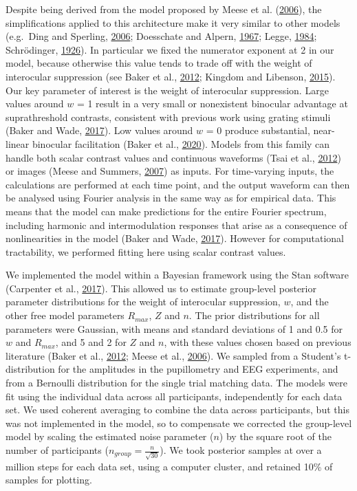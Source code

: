 \documentclass[
]{article}
\begin{document}
Despite being derived from the model proposed by Meese et al. (\protect\hyperlink{ref-Meese2006}{2006}), the simplifications applied to this architecture make it very similar to other models (e.g.~Ding and Sperling, \protect\hyperlink{ref-Ding2006}{2006}; Doesschate and Alpern, \protect\hyperlink{ref-Doesschate1967}{1967}; Legge, \protect\hyperlink{ref-Legge1984}{1984}; Schrödinger, \protect\hyperlink{ref-Schrodinger1926}{1926}). In particular we fixed the numerator exponent at 2 in our model, because otherwise this value tends to trade off with the weight of interocular suppression (see Baker et al., \protect\hyperlink{ref-Baker2012}{2012}; Kingdom and Libenson, \protect\hyperlink{ref-Kingdom2015}{2015}). Our key parameter of interest is the weight of interocular suppression. Large values around \(w\) = 1 result in a very small or nonexistent binocular advantage at suprathreshold contrasts, consistent with previous work using grating stimuli (Baker and Wade, \protect\hyperlink{ref-Baker2017}{2017}). Low values around \(w\) = 0 produce substantial, near-linear binocular facilitation (Baker et al., \protect\hyperlink{ref-Baker2020}{2020}). Models from this family can handle both scalar contrast values and continuous waveforms (Tsai et al., \protect\hyperlink{ref-Tsai2012}{2012}) or images (Meese and Summers, \protect\hyperlink{ref-Meese2007}{2007}) as inputs. For time-varying inputs, the calculations are performed at each time point, and the output waveform can then be analysed using Fourier analysis in the same way as for empirical data. This means that the model can make predictions for the entire Fourier spectrum, including harmonic and intermodulation responses that arise as a consequence of nonlinearities in the model (Baker and Wade, \protect\hyperlink{ref-Baker2017}{2017}). However for computational tractability, we performed fitting here using scalar contrast values.

We implemented the model within a Bayesian framework using the Stan software (Carpenter et al., \protect\hyperlink{ref-Carpenter2017}{2017}). This allowed us to estimate group-level posterior parameter distributions for the weight of interocular suppression, \(w\), and the other free model parameters \(R_{max}\), \(Z\) and \(n\). The prior distributions for all parameters were Gaussian, with means and standard deviations of 1 and 0.5 for \(w\) and \(R_{max}\), and 5 and 2 for \(Z\) and \(n\), with these values chosen based on previous literature (Baker et al., \protect\hyperlink{ref-Baker2012}{2012}; Meese et al., \protect\hyperlink{ref-Meese2006}{2006}). We sampled from a Student's t-distribution for the amplitudes in the pupillometry and EEG experiments, and from a Bernoulli distribution for the single trial matching data. The models were fit using the individual data across all participants, independently for each data set. We used coherent averaging to combine the data across participants, but this was not implemented in the model, so to compensate we corrected the group-level model by scaling the estimated noise parameter (\(n\)) by the square root of the number of participants (\(n_{group} = \frac{n}{\sqrt{30}}\)). We took posterior samples at over a million steps for each data set, using a computer cluster, and retained 10\% of samples for plotting.
\end{document}
